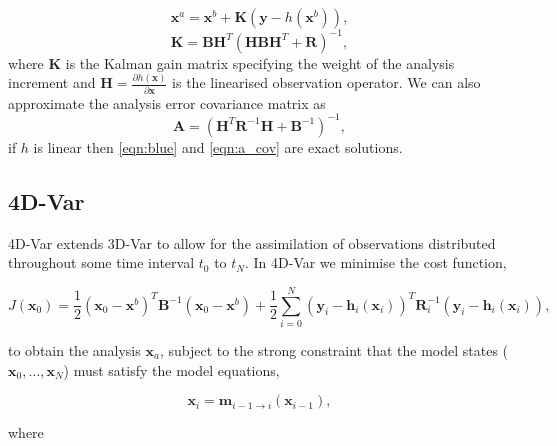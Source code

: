 \documentclass[12pt]{article}
\begin{document}
\begin{equation}
\textbf{x}^{a} = \textbf{x}^{b} + \textbf{K}(\textbf{y} - h(\textbf{x}^{b})), \label{eqn:blue}
\end{equation}
\begin{equation}
\textbf{K} = \textbf{B}\textbf{H}^{T}(\textbf{H}\textbf{B}\textbf{H}^{T}+\textbf{R})^{-1},
\end{equation}
where \textbf{K} is the Kalman gain matrix specifying the weight of the analysis increment and \(\textbf{H}=\frac{\partial h(\textbf{x})}{\partial \textbf{x}}\) is the linearised observation operator. We can also approximate the analysis error covariance matrix as
\begin{equation}
\textbf{A} = (\textbf{H}^{T}\textbf{R}^{-1}\textbf{H}+\textbf{B}^{-1})^{-1}, \label{eqn:a_cov}
\end{equation}
if \( h \) is linear then \eqref{eqn:blue} and \eqref{eqn:a_cov} are exact solutions.


\subsection{4D-Var}

4D-Var extends 3D-Var to allow for the assimilation of observations distributed throughout some time interval \(t_{0}\) to \(t_{N}\). In 4D-Var we minimise the cost function,

\begin{equation}
J(\textbf{x}_0) = \frac{1}{2}(\textbf{x}_0-\textbf{x}^b)^{T}\textbf{B}^{-1}(\textbf{x}_0-\textbf{x}^b)+\frac{1}{2}\sum_{i=0}^{N}(\textbf{y}_i-\textbf{h}_i(\textbf{x}_i))^{T}\textbf{R}_{i}^{-1}(\textbf{y}_i-\textbf{h}_i(\textbf{x}_i)),
\end{equation}

to obtain the analysis \(\textbf{x}_{a}\), subject to the strong constraint that the model states (\(\textbf{x}_0, \dots, \textbf{x}_N\)) must satisfy the model equations,

\begin{equation}
\textbf{x}_{i} = \textbf{m}_{i-1 \rightarrow i}(\textbf{x}_{i-1}), \label{eqn:nonlinmod}
\end{equation}

where 
\end{document}
